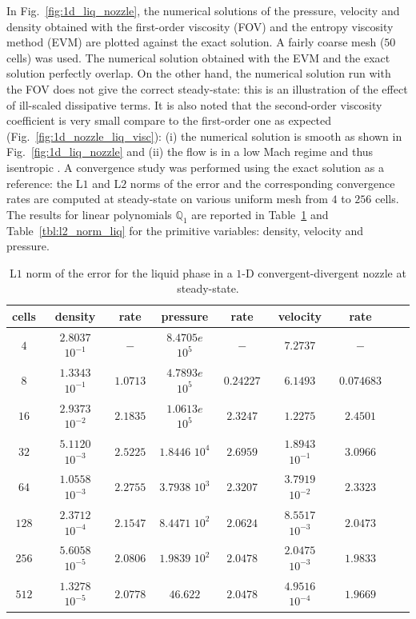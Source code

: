 \documentclass[preprint,10pt]{elsarticle}
\newcommand{\fig}[1]{Fig.~\ref{#1}}                      %
\newcommand{\tbl}[1]{Table~\ref{#1}}                     %
\begin{document}
In \fig{fig:1d_liq_nozzle}, the numerical solutions of the pressure, velocity and density obtained with the first-order viscosity (FOV) and the entropy viscosity method (EVM) are plotted against the exact solution. A fairly coarse mesh ($50$ cells) was used. The numerical solution obtained with the EVM and the exact solution perfectly overlap.
On the other hand, the numerical solution run with the FOV does not give the correct steady-state: this is an illustration of the effect of ill-scaled dissipative terms. 
It is also noted that the second-order viscosity coefficient  is very small compare to the first-order one as expected (\fig{fig:1d_nozzle_liq_visc}): (i) the numerical solution is smooth as shown in \fig{fig:1d_liq_nozzle} and (ii) the flow is in a low Mach regime and thus isentropic . A convergence study was performed using the exact solution as a reference: the L$1$ and L$2$ norms of the error and the corresponding convergence rates are computed at steady-state on various uniform mesh from $4$ to $256$ cells. The results for linear polynomials $\mathbb{Q}_1$ are reported in \tbl{tbl:l1_norm_liq} and \tbl{tbl:l2_norm_liq} for the primitive variables: density, velocity and pressure.
\begin{table}[H]
\begin{center}
 \caption{\label{tbl:l1_norm_liq} L$1$ norm of the error for the liquid phase in a $1$-D convergent-divergent nozzle at steady-state.}
 \begin{tabular}{|c|c|c|c|c|c|c|c|c|}
 \hline
   cells & density & rate & pressure & rate & velocity & rate \\
 \hline
$4$ &   $2.8037$ $10^{-1}$ & $-$ & $8.4705e$ $10^{5}$ & $-$ & $7.2737$                   & $-$\\
  \hline
$8$  &  $1.3343$ $10^{-1}$ & $1.0713$ & $4.7893e$ $10^{5}$ & $0.24227$ & $6.1493$                   & $0.074683$\\
   \hline
$16$ & $2.9373$ $10^{-2}$ & $2.1835$ & $1.0613e$ $10^{5}$ & $2.3247$ & $1.2275$& $2.4501$\\
 \hline
$32$ & $5.1120$ $10^{-3}$ & $2.5225$ & $1.8446$ $10^{4}$ & $2.6959$ & $1.8943$ $10^{-1}$ & $3.0966$\\
 \hline
$64$ & $1.0558$ $10^{-3}$ & $2.2755$ & $3.7938$ $10^{3}$ & $2.3207$ & $3.7919$ $10^{-2}$ & $2.3323$\\
 \hline
$128$&$2.3712$ $10^{-4}$ & $2.1547$ & $8.4471$ $10^{2}$ & $2.0624$ & $8.5517$ $10^{-3}$ & $2.0473$\\
 \hline
$256$&$5.6058$ $10^{-5}$& $2.0806$ & $1.9839$ $10^{2}$ & $2.0478$ & $2.0475$ $10^{-3}$ & $1.9833$\\
 \hline
 $512$&$1.3278$ $10^{-5}$& $2.0778$ & $46.622$ & $2.0478$ & $4.9516$ $10^{-4}$ & $1.9669$\\
 \hline
\end{tabular}
\end{center}
\nonumber
\end{table}
\end{document}
